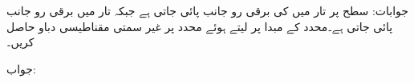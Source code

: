 جوابات: 
سطح  پر تار  میں  کی برقی رو  جانب پائی جاتی ہے جبکہ تار  میں  برقی رو  جانب پائی جاتی ہے۔محدد کے مبدا پر  لیتے ہوئے  محدد پر غیر سمتی مقناطیسی دباو  حاصل کریں۔

جواب:

